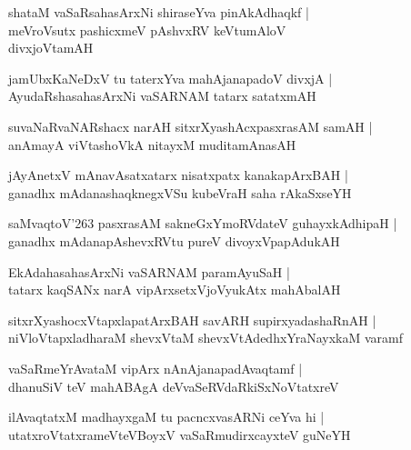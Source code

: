 \documentclass[twoside,12pt,openright]{book}
\newcounter{shloka}[chapter]
\begin{document}
\begin{shloka}
shataM vaSaRsahasArxNi shiraseYva pinAkAdhaqkf |\\
meVroVsutx pashicxmeV pAshvxRV keVtumAloV \\
\qquad\qquad\hfill{divxjoVtamAH}
\end{shloka}

\begin{shloka}
jamUbxKaNeDxV tu taterxYva mahAjanapadoV divxjA |\\
AyudaRshasahasArxNi vaSARNAM tatarx satatxmAH
\end{shloka}

\begin{shloka}
suvaNaRvaNARshacx narAH sitxrXyashAcxpasxrasAM samAH |\\
anAmayA viVtashoVkA nitayxM muditamAnasAH
\end{shloka}

\begin{shloka}
jAyAnetxV mAnavAsatxatarx nisatxpatx kanakapArxBAH |\\
ganadhx mAdanashaqknegxVSu kubeVraH saha rAkaSxseYH
\end{shloka}

\begin{shloka}
saMvaqtoV\char'263 pasxrasAM sakneGxYmoRVdateV guhayxkAdhipaH |\\
ganadhx mAdanapAshevxRVtu pureV divoyxVpapAdukAH
\end{shloka}

\begin{shloka}
EkAdahasahasArxNi vaSARNAM paramAyuSaH |\\
tatarx kaqSANx narA vipArxsetxVjoVyukAtx mahAbalAH
\end{shloka}

\begin{shloka}
sitxrXyashocxVtapxlapatArxBAH savARH supirxyadashaRnAH |\\
niVloVtapxladharaM shevxVtaM shevxVtAdedhxYraNayxkaM varamf
\end{shloka}

\begin{shloka}
vaSaRmeYrAvataM vipArx nAnAjanapadAvaqtamf |\\
dhanuSiV teV mahABAgA deVvaSeRVdaRkiSxNoVtatxreV
\end{shloka}

\begin{shloka}
ilAvaqtatxM madhayxgaM tu pacncxvasARNi ceYva hi |\\
utatxroVtatxrameVteVBoyxV vaSaRmudirxcayxteV guNeYH
\end{shloka}
\end{document}
